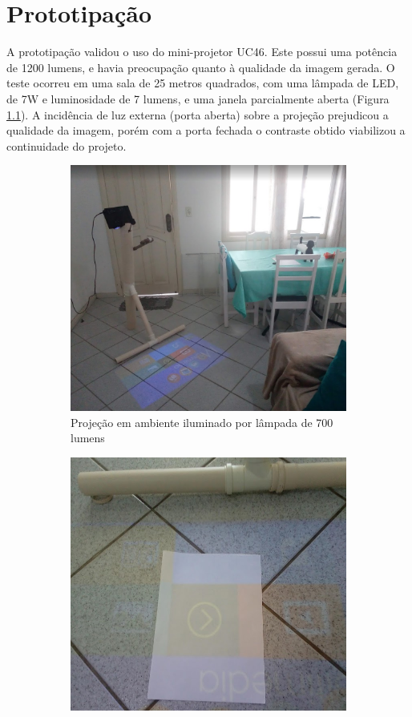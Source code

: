 \chapter{Prototipação}
\label{apendice_e}
A prototipação validou o uso do mini-projetor UC46. Este possui uma potência de 1200 lumens, e havia preocupação quanto à qualidade da imagem gerada. O teste ocorreu em uma sala de 25 metros quadrados, com uma lâmpada de LED, de 7W e luminosidade de 7 lumens, e uma janela parcialmente aberta (Figura \ref{fig:projection}). A incidência de luz externa (porta aberta) sobre a projeção prejudicou a qualidade da imagem, porém com a porta fechada o contraste obtido viabilizou a continuidade do projeto.
\begin{figure}[h]
    \centering
    \begin{subfigure}{.33\textwidth}
        \centering
        \includegraphics[width=.9\linewidth,fbox]{figs/projection.png}
        \caption{Projeção em ambiente iluminado por lâmpada de 700 lumens}
        \label{fig:projection}
    \end{subfigure}%
    \begin{subfigure}{.33\textwidth}
        \centering
        \includegraphics[width=.9\linewidth,fbox]{figs/projection_day.png}

\end{subfigure}
\end{figure}
